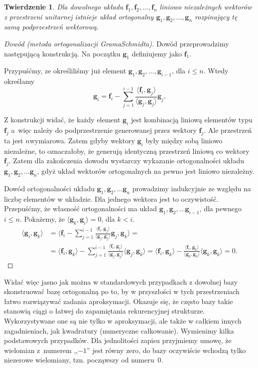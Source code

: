 \documentclass[12pt]{mwbk}
\let\leq\leqslant\let\le\leq\let\geq\geqslant\let\ge\geq
\theoremstyle{plain}
\newtheorem{twier}{Twierdzenie}[chapter] %
\theoremstyle{definition}
\theoremstyle{remark}
\newcommand{\ff}{\mathbf{f}}
\newcommand{\gggg}{\mathbf{g}}
\newcommand{\skalar}[2]{\pmb{\langle}#1,#2\pmb{\rangle}}
\begin{document}
\begin{twier}
	Dla dowolnego układu $\ff_1,\ff_2,\ldots, \ff_n$ liniowo niezależnych
	wektorów z przestrzeni unitarnej istnieje układ ortogonalny
	$\gggg_1,\gggg_2,\ldots,\gggg_n$ rozpinający tę samą podprzestrzeń wektorową.
\end{twier}
\begin{proof}[Dowód \emph{(metoda \emph{ortogonalizacji Grama\dywiz Schmidta})}]

  
  Dowód przeprowadzimy następującą konstrukcją. Na początku 
  $\gggg_1$ definiujemy jako $\ff_1$. 

Przypuśćmy, ze określiliśmy już element $\gggg_1,\gggg_2,\ldots,\gggg_{i-1}$, dla
$i\leq n$. Wtedy określamy
\[
\gggg_i=\ff_i-\sum_{j=1}^{i-1}\frac{\skalar{\ff_i}{\gggg_j}}{\skalar{\gggg_j}{\gggg_j}}\gggg_j.
	\]

	Z konstrukcji widać, że każdy element $\gggg_i$ jest kombinacją liniową
	elementów typu $\ff_j$ a~więc należy do podprzestrzenie generowanej
	przez wektory $\ff_j$. Ale przestrzeń ta jest $n$\dywiz wymiarowa. Zatem
	gdyby wektory $\gggg_i$ były między sobą liniowo niezależne, to
	oznaczałoby, że generują identyczną przestrzeń liniową co wektory
	$\ff_j$. Zatem dla zakończenia dowodu wystarczy wykazanie ortogonalności
	układu 
	$\gggg_1,\gggg_2,\ldots \gggg_n$, 
	gdyż układ wektorów ortogonalnych na
	pewno jest liniowo niezależny. 

	Dowód ortogonalności układu
	$\gggg_1,\gggg_2,\ldots \gggg_n$ prowadzimy indukcyjnie ze względu na liczbę
	elementów w układzie. Dla jednego wektora jest to
	oczywistość. Przepuśćmy, że własność ortogonalności ma układ  
	$\gggg_1,\gggg_2,\ldots \gggg_{i-1}$, dla pewnego $i\leq n$. Pokażemy, że
	$\skalar{\gggg_k}{\gggg_i}=0$, dla $k<i$.
	\[
\begin{aligned}
\skalar{\gggg_i}{\gggg_k}&=\skalar{
\ff_i-\sum_{j=1}^{i-1}\frac{\skalar{\ff_i}{\gggg_j}}{\skalar{\gggg_j}{\gggg_j}}\gggg_j 
}{\gggg_k}=\\
&=
\skalar{\ff_i}{\gggg_k}-\sum_{j=1}^{i-1}\frac{\skalar{\ff_i}{\gggg_j}}{\skalar{\gggg_j}{\gggg_j}}\skalar{\gggg_j}{\gggg_k} 
=
\skalar{\ff_i}{\gggg_k}-\frac{\skalar{\ff_i}{\gggg_k}}{\skalar{\gggg_k}{\gggg_k}}\skalar{\gggg_k}{\gggg_k} 
=0.
\end{aligned}
\]
\end{proof}


Widać więc jasno jak można w standardowych przypadkach z dowolnej bazy
skonstruować bazę ortogonalną po to, by w przyszłości w tych przestrzeniach
łatwo rozwiązywać zadania aproksymacji. Okazuje się, że często bazy takie
stanowią ciągi o łatwej do zapamiętania rekurencyjnej strukturze. Wykorzystywane
one są nie tylko w aproksymacji, ale także w całkiem innych zagadnieniach, jak
kwadratury (numeryczne całkowanie). Wymienimy kilka podstawowych przypadków.
Dla jednolitości zapisu przyjmiemy umowę, że wielomian z~numerem ,,$-1$'' jest
równy zero, do bazy oczywiście wchodzą tylko niezerowe wielomiany, tzn.
począwszy od numeru~$0$.
\end{document}
